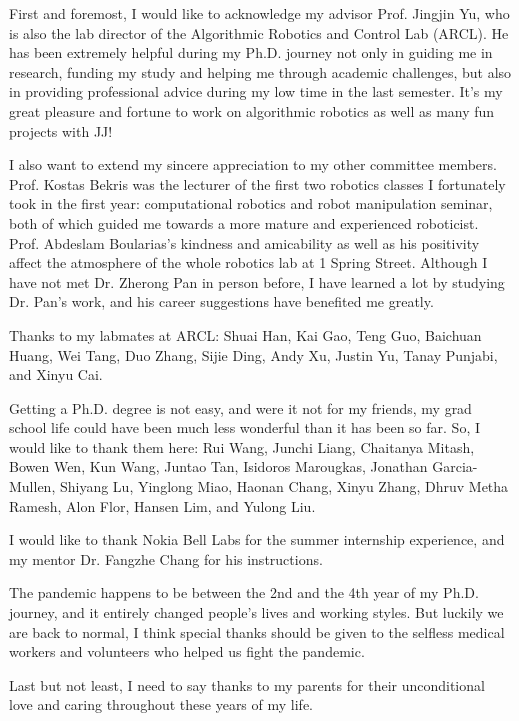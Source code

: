 
\begin{acknowledgments}
First and foremost, I would like to acknowledge my advisor Prof. Jingjin Yu, 
who is also the lab director of the Algorithmic Robotics and Control Lab (ARCL). 
He has been extremely helpful during my Ph.D. journey 
not only in guiding me in research, funding my study and helping me through academic challenges, 
but also in providing professional advice during my low time in the last semester. 
It's my great pleasure and fortune to work on algorithmic robotics 
as well as many fun projects with JJ! 

I also want to extend my sincere appreciation to my other committee members. 
Prof. Kostas Bekris was the lecturer of the first two robotics classes I fortunately took in the first year: 
computational robotics and robot manipulation seminar, both of which guided me 
towards a more mature and experienced roboticist. 
Prof. Abdeslam Boularias's kindness and amicability as well as his positivity affect
the atmosphere of the whole robotics lab at 1 Spring Street.
Although I have not met Dr. Zherong Pan in person before, 
I have learned a lot by studying Dr. Pan's work, 
and his career suggestions have benefited me greatly.

Thanks to my labmates at ARCL: Shuai Han, 
Kai Gao, Teng Guo, Baichuan Huang, Wei Tang, Duo Zhang, Sijie Ding, Andy Xu, Justin Yu, Tanay Punjabi, 
and Xinyu Cai. 

Getting a Ph.D. degree is not easy, and were it not for my friends, my grad school life 
could have been much less wonderful than it has been so far. 
So, I would like to thank them here: Rui Wang, Junchi Liang, Chaitanya Mitash, Bowen Wen, Kun Wang, Juntao Tan, 
Isidoros Marougkas, Jonathan Garcia-Mullen, Shiyang Lu, Yinglong Miao, Haonan Chang, Xinyu Zhang, 
Dhruv Metha Ramesh, Alon Flor, Hansen Lim, and Yulong Liu. 

I would like to thank Nokia Bell Labs for the summer internship experience,
and my mentor Dr. Fangzhe Chang for his instructions.

The pandemic happens to be between the 2nd and the 4th year of my Ph.D. journey, 
and it entirely changed people's lives and working styles. 
But luckily we are back to normal, I think special thanks should be given to the 
selfless medical workers and volunteers who helped us fight the pandemic. 

Last but not least, I need to say thanks to my parents for their unconditional love 
and caring throughout these years of my life. 

\end{acknowledgments}
